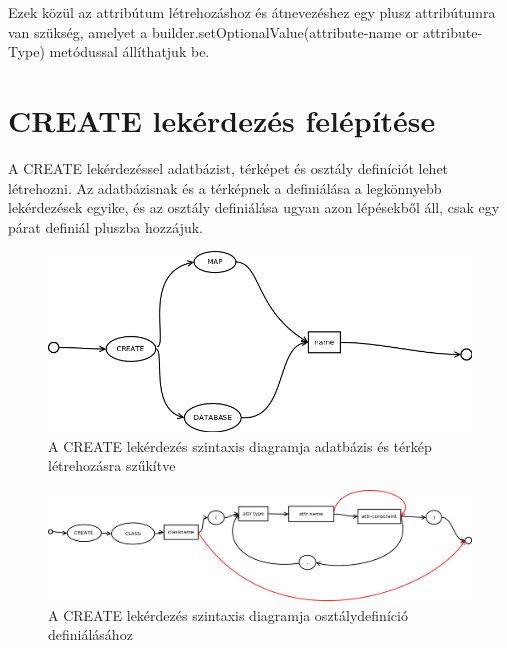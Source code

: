 Ezek közül az attribútum létrehozáshoz és átnevezéshez egy plusz attribútumra van szükség, amelyet a builder.setOptionalValue(attribute-name or attribute-Type)
metódussal állíthatjuk be.

\section{CREATE lekérdezés felépítése}

A CREATE lekérdezéssel adatbázist, térképet és osztály definíciót lehet létrehozni. Az adatbázisnak és a térképnek a definiálása a legkönnyebb lekérdezések egyike, és az osztály definiálása ugyan azon lépésekből áll, csak egy párat definiál pluszba hozzájuk.

\begin{figure}[htb]
	\begin{center}
		\includegraphics[scale=0.4]{images/create}
		\caption{A CREATE lekérdezés szintaxis diagramja adatbázis és térkép létrehozásra szűkítve}
		\label{fig:createSytnax}
	\end{center}
\end{figure}

\begin{figure}[htb]
	\begin{center}
		\includegraphics[scale=0.4]{images/createclass}
		\caption{A CREATE lekérdezés szintaxis diagramja osztálydefiníció definiálásához}
		\label{fig:createClassSytnax}
	\end{center}
\end{figure}



